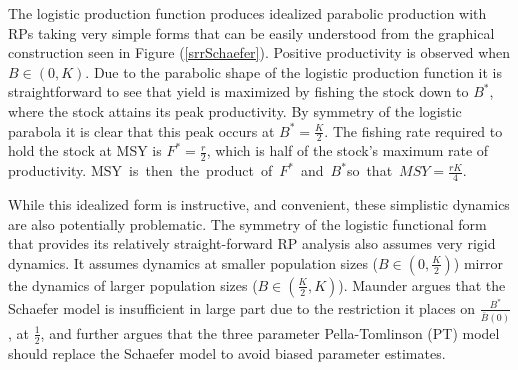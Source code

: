 %
The logistic production function produces idealized parabolic production with
RPs taking very simple forms that can be easily understood from the
graphical construction seen in Figure (\ref{srrSchaefer}). Positive
productivity is observed when \mbox{$B\in(0, K)$.} Due to the parabolic shape of the
logistic production function it is straightforward to see that yield is maximized
by fishing the stock down to $B^*$, where the stock attains its peak productivity.
By symmetry of the logistic parabola it is clear that this peak occurs at 
$B^*=\frac{K}{2}$. The fishing rate required to hold the stock at MSY is 
$F^*=\frac{r}{2}$, which is half of the stock's maximum rate of productivity. 
\mbox{MSY is then the product of $F^*$ and $B^*$so that $MSY=\frac{rK}{4}$.}

%
While this idealized form is instructive, and convenient, these simplistic 
dynamics are also potentially problematic. The symmetry of the logistic 
functional form that provides its relatively straight-forward RP analysis also 
assumes very rigid dynamics. It assumes dynamics at smaller population sizes ($B\in(0, \frac{K}{2})$)
mirror the dynamics of larger population sizes ($B\in(\frac{K}{2}, K)$).
Maunder \cite{maunder_is_2003} argues that the Schaefer model is
insufficient in large part due to the restriction it places on $\frac{B^*}{\bar B(0)}$,
at $\frac{1}{2}$, and further argues that the three parameter Pella-Tomlinson
(PT) model \cite{pella_generalized_1969} should replace the Schaefer model to 
avoid biased parameter estimates.


